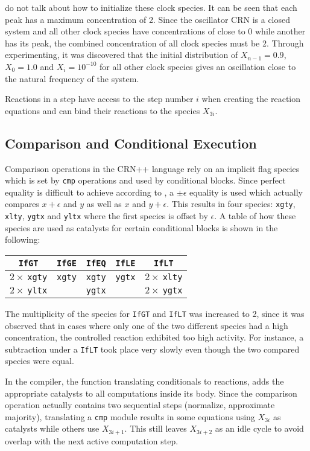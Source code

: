 \citeauthor{soloveichik2018a} do not talk about how to initialize these clock species. It can be seen that each peak has a maximum concentration of 2. Since the oscillator CRN is a closed system and all other clock species have concentrations of close to 0 while another has its peak, the combined concentration of all clock species must be 2. Through experimenting, it was discovered that the initial distribution of $X_{n-1}=0.9$, $X_{0}=1.0$ and $X_i=10^{-10}$ for all other clock species gives an oscillation close to the natural frequency of the system.

Reactions in a step have access to the step number $i$ when creating the reaction equations and can bind their reactions to the species $X_{3i}$.

\subsection{Comparison and Conditional Execution}
Comparison operations in the CRN++ language rely on an implicit flag species which is set by \texttt{cmp} operations and used by conditional blocks. Since perfect equality is difficult to achieve according to \citeauthor{soloveichik2018a}, a $\pm \epsilon$ equality is used which actually compares $x+\epsilon$ and $y$ as well as $x$ and $y+\epsilon$. This results in four species: \texttt{xgty}, \texttt{xlty}, \texttt{ygtx} and \texttt{yltx} where the first species is offset by $\epsilon$. A table of how these species are used as catalysts for certain conditional blocks is shown in the following:

\begin{center}
\begin{tabular}{c|c|c|c|c}
    \texttt{IfGT} & \texttt{IfGE} & \texttt{IfEQ} & \texttt{IfLE} & \texttt{IfLT} \\\hline
    $2\times\:$\texttt{xgty} & \texttt{xgty} & \texttt{xgty} & \texttt{ygtx} & $2\times\:$\texttt{xlty} \\
    $2\times\:$\texttt{yltx} & & \texttt{ygtx} & & $2\times\:$\texttt{ygtx}
\end{tabular}
\end{center}

The multiplicity of the species for \texttt{IfGT} and \texttt{IfLT} was increased to 2, since it was observed that in cases where only one of the two different species had a high concentration, the controlled reaction exhibited too high activity. For instance, a subtraction under a \texttt{IfLT} took place very slowly even though the two compared species were equal.

In the compiler, the function translating conditionals to reactions, adds the appropriate catalysts to all computations inside its body. Since the comparison operation actually contains two sequential steps (normalize, approximate majority), translating a \texttt{cmp} module results in some equations using $X_{3i}$ as catalysts while others use $X_{3i+1}$. This still leaves $X_{3i+2}$ as an idle cycle to avoid overlap with the next active computation step.
